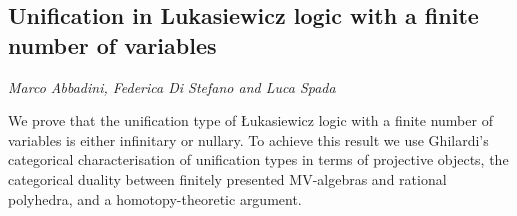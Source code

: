 \documentclass[../booklet.tex]{subfiles}
\begin{document}
\subsection[Unification in Lukasiewicz logic with a finite number of variables. {\it Marco Abbadini, Federica Di Stefano and Luca Spada}]{Unification in Lukasiewicz logic with a finite number of variables}
  

\begin{center}
  {\it Marco Abbadini, Federica Di Stefano and Luca Spada}
\end{center}



We prove that the unification type of {\L}ukasiewicz logic with a finite number of variables is either infinitary or nullary.  To achieve this result we use Ghilardi's categorical characterisation of unification types in terms of projective objects,  the categorical duality between finitely presented MV-algebras and rational polyhedra, and a homotopy-theoretic argument.
\end{document}
